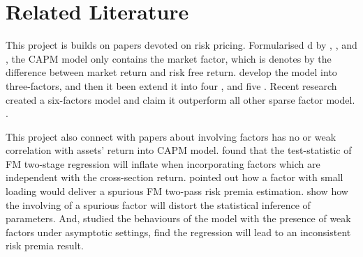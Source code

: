 \documentclass[12pt]{article}
\begin{document}














	\section{Related Literature}

This project is builds on papers devoted on  risk pricing.
Formularised d by , , and , the CAPM model only contains the market factor, which is denotes by the difference between market return and risk free return.
 develop the model into three-factors, and then it been extend it into four \cite{Carhart1997}, and five \cite{Fama2015}.
Recent research created a six-factors model and claim it outperform all other sparse factor model. \cite{Kelly2019}.

This project also connect with papers about involving factors has no or weak correlation with assets' return into CAPM model.
 found that the test-statistic of FM two-stage regression  \cite{Fama1973} will inflate when incorporating factors which are independent with the cross-section return.
 pointed out how a factor with small loading would deliver a spurious FM two-pass risk premia estimation. 
 show how the involving of a spurious factor will distort the statistical inference of parameters.
And,  studied the behaviours of the model with the presence of weak factors under asymptotic settings, find the regression will lead to an inconsistent risk premia result.
	
\end{document}
